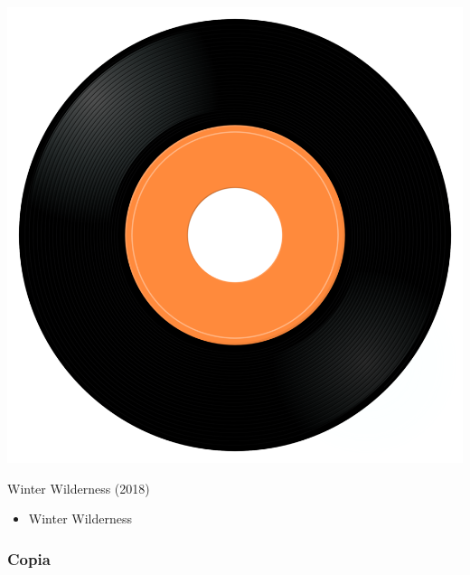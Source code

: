 \begin{minipage}[t]{0.25\textwidth}\vspace{0pt}
\captionsetup{type=figure}
\includegraphics[width=\textwidth]{Images/cover.png}
\caption*{Winter Wilderness (2018)}
\end{minipage}
\begin{minipage}[t]{0.25\textwidth}\vspace{0pt}
\begin{itemize}[nosep,leftmargin=1em,labelwidth=*,align=left]
	\setlength{\itemsep}{0pt}
	\item Winter Wilderness 
\end{itemize}
\end{minipage}


\subsubsection{Copia}

